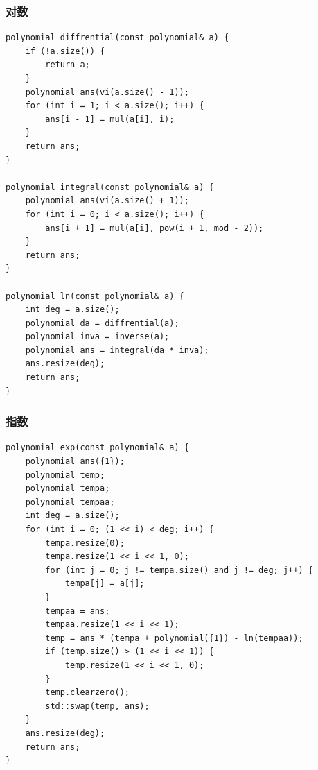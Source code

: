 \documentclass[UTF8, a4paper, titlepage, twoside]{ctexart}
\begin{document}
\subsubsection*{ 对数 }
\begin{lstlisting}[style=cpp]
polynomial diffrential(const polynomial& a) {
    if (!a.size()) {
        return a;
    }
    polynomial ans(vi(a.size() - 1));
    for (int i = 1; i < a.size(); i++) {
        ans[i - 1] = mul(a[i], i);
    }
    return ans;
}

polynomial integral(const polynomial& a) {
    polynomial ans(vi(a.size() + 1));
    for (int i = 0; i < a.size(); i++) {
        ans[i + 1] = mul(a[i], pow(i + 1, mod - 2));
    }
    return ans;
}

polynomial ln(const polynomial& a) {
    int deg = a.size();
    polynomial da = diffrential(a);
    polynomial inva = inverse(a);
    polynomial ans = integral(da * inva);
    ans.resize(deg);
    return ans;
}
\end{lstlisting}

\subsubsection*{ 指数 }
\begin{lstlisting}[style=cpp]
polynomial exp(const polynomial& a) {
    polynomial ans({1});
    polynomial temp;
    polynomial tempa;
    polynomial tempaa;
    int deg = a.size();
    for (int i = 0; (1 << i) < deg; i++) {
        tempa.resize(0);
        tempa.resize(1 << i << 1, 0);
        for (int j = 0; j != tempa.size() and j != deg; j++) {
            tempa[j] = a[j];
        }
        tempaa = ans;
        tempaa.resize(1 << i << 1);
        temp = ans * (tempa + polynomial({1}) - ln(tempaa));
        if (temp.size() > (1 << i << 1)) {
            temp.resize(1 << i << 1, 0);
        }
        temp.clearzero();
        std::swap(temp, ans);
    }
    ans.resize(deg);
    return ans;
}
\end{lstlisting}
\end{document}
